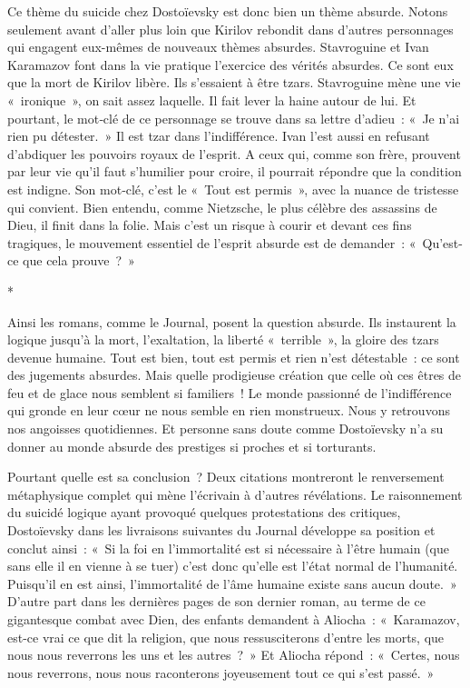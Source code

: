\documentclass{book}
\begin{document}
Ce thème du suicide chez Dostoïevsky est donc bien un thème absurde. Notons seulement avant d'aller plus loin que Kirilov rebondit dans d'autres personnages qui engagent eux-mêmes de nouveaux thèmes absurdes. Stavroguine et Ivan Karamazov font dans la vie pratique l'exercice des vérités absurdes. Ce sont eux que la mort de Kirilov libère. Ils s'essaient à être tzars. Stavroguine mène une vie « ironique », on sait assez laquelle. Il fait lever la haine autour de lui. Et pourtant, le mot‑clé de ce personnage se trouve dans sa lettre d'adieu : « Je n'ai rien pu détester. » Il est tzar dans l'indifférence. Ivan l'est aussi en refusant d'abdiquer les pouvoirs royaux de l'esprit. A ceux qui, comme son frère, prouvent par leur vie qu'il faut s'humilier pour croire, il pourrait répondre que la condition est indigne. Son mot‑clé, c'est le « Tout est permis », avec la nuance de tristesse qui convient. Bien entendu, comme Nietzsche, le plus célèbre des assassins de Dieu, il finit dans la folie. Mais c'est un risque à courir et devant ces fins tragiques, le mouvement essentiel de l'esprit absurde est de demander : « Qu’est-ce que cela prouve ? »

\begin{center}
*
\end{center}

Ainsi les romans, comme le Journal, posent la question absurde. Ils instaurent la logique jusqu'à la mort, l'exaltation, la liberté « terrible », la gloire des tzars devenue humaine. Tout est bien, tout est permis et rien n'est détestable : ce sont des jugements absurdes. Mais quelle prodigieuse création que celle où ces êtres de feu et de glace nous semblent si familiers ! Le monde passionné de l'indifférence qui gronde en leur cœur ne nous semble en rien monstrueux. Nous y retrouvons nos angoisses quotidiennes. Et personne sans doute comme Dostoïevsky n'a su donner au monde absurde des prestiges si proches et si torturants.

Pourtant quelle est sa conclusion ? Deux citations montreront le renversement métaphysique complet qui mène l'écrivain à d'autres révélations. Le raisonnement du suicidé logique ayant provoqué quelques protestations des critiques, Dostoïevsky dans les livraisons suivantes du Journal développe sa position et conclut ainsi : « Si la foi en l'immortalité est si nécessaire à l'être humain (que sans elle il en vienne à se tuer) c'est donc qu'elle est l'état normal de l'humanité. Puisqu'il en est ainsi, l'immortalité de l'âme humaine existe sans aucun doute. » D'autre part dans les dernières pages de son dernier roman, au terme de ce gigantesque combat avec Dien, des enfants demandent à Aliocha : « Karamazov, est-ce vrai ce que dit la religion, que nous ressusciterons d'entre les morts, que nous nous reverrons les uns et les autres ? » Et Aliocha répond : « Certes, nous nous reverrons, nous nous raconterons joyeusement tout ce qui s'est passé. »
\end{document}
